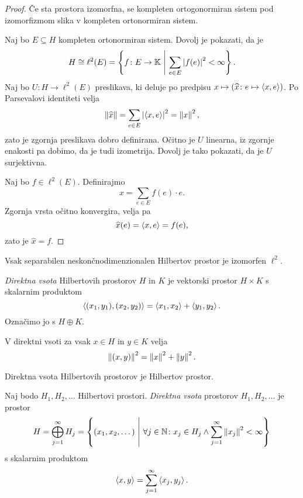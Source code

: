 \begin{proof}
Če sta prostora izomorfna, se kompleten ortogonormiran sistem pod
izomorfizmom slika v kompleten ortonormiran sistem.

Naj bo $E \subseteq H$ kompleten ortonormiran sistem. Dovolj je
pokazati, da je
\[
H \cong \ell^2(E) =
\left\{f \colon E \to \mathbb{K}~\middle\vert~\sum_{e \in E} \left\lvert f(e)\right\rvert^2 < \infty\right\}.
\]
Naj bo
$U \colon H \to \ell^2(E)$ preslikava, ki deluje po predpisu
$x \mapsto (\widehat{x} \colon e \mapsto \left\langle x,e\right\rangle)$. Po
Parsevalovi identiteti velja
\[
\left\lVert \widehat{x}\right\rVert = \sum_{e \in E} \left\lvert \left\langle x,e\right\rangle\right\rvert^2 = \left\lVert x\right\rVert^2,
\]
zato je zgornja preslikava dobro definirana. Očitno je $U$
linearna, iz zgornje enakosti pa dobimo, da je tudi izometrija.
Dovolj je tako pokazati, da je $U$ surjektivna.

Naj bo $f \in \ell^2(E)$. Definirajmo
\[
x = \sum_{e \in E} f(e) \cdot e.
\]
Zgornja vrsta očitno konvergira, velja pa
\[
\widehat{x}(e) = \left\langle x,e\right\rangle = f(e),
\]
zato je $\widehat{x} = f$.
\end{proof}

\begin{posledica}
Vsak separabilen neskončnodimenzionalen Hilbertov prostor je
izomorfen $\ell^2$.
\end{posledica}

\begin{definicija}
\emph{Direktna vsota}
Hilbertovih prostorov $H$ in $K$ je vektorski prostor $H \times K$
s skalarnim produktom
\[
\left\langle (x_1,y_1), (x_2,y_2)\right\rangle = \left\langle x_1, x_2\right\rangle + \left\langle y_1, y_2\right\rangle.
\]
Označimo jo s $H \oplus K$.
\end{definicija}

\begin{opomba}
V direktni vsoti za vsak $x \in H$ in $y \in K$ velja
\[
\left\lVert (x,y)\right\rVert^2 = \left\lVert x\right\rVert^2 + \left\lVert y\right\rVert^2.
\]
\end{opomba}

\begin{opomba}
Direktna vsota Hilbertovih prostorov je Hilbertov prostor.
\end{opomba}

\begin{definicija}
Naj bodo $H_1, H_2, \dots$ Hilbertovi prostori.
\emph{Direktna vsota} prostorov $H_1, H_2, \dots$ je prostor
\[
H = \bigoplus_{j=1}^\infty H_j =
\left\{(x_1, x_2, \dots)~\middle\vert~\forall j \in \mathbb{N} \colon x_j \in H_j \land
\sum_{j=1}^\infty \left\lVert x_j\right\rVert^2 < \infty\right\}
\]
s skalarnim produktom
\[
\left\langle x,y\right\rangle = \sum_{j=1}^\infty \left\langle x_j, y_j\right\rangle.
\]
\end{definicija}

